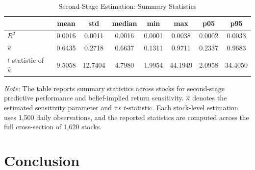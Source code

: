 \documentclass[11pt]{article}
\begin{document}
\begin{table}[H]
\centering
\caption{Second-Stage Estimation: Summary Statistics}
\label{tab:summary_stats_stage2}

\begin{tabularx}{\textwidth}{@{}>{\small}Xccccccc@{}}
\toprule
 & mean & std & median & min & max & p05 & p95 \\
\midrule
$R^2$  & 0.0016 & 0.0011 & 0.0016 & 0.0001 & 0.0038 & 0.0002 & 0.0033 \\
$\hat{\kappa}$ & 0.6435 & 0.2718 & 0.6637 & 0.1311 & 0.9711 & 0.2337 & 0.9683 \\
$t$-statistic of $\hat{\kappa}$ & 9.5058 & 12.7404 & 4.7980 & 1.9954 & 44.1949 & 2.0958 & 34.4050 \\
\bottomrule
\end{tabularx}

\medskip
\begin{minipage}{\textwidth}
\footnotesize
\textit{Note:} The table reports summary statistics across stocks for second-stage
predictive performance and belief-implied return sensitivity. 
$\hat{\kappa}$ denotes the estimated sensitivity parameter and its $t$-statistic.
Each stock-level estimation uses 1{,}500 daily observations, and the reported statistics are computed across the
full cross-section of 1{,}620 stocks.
\end{minipage}
\end{table}




\section{Conclusion}\label{sec:conclusion}
\end{document}
